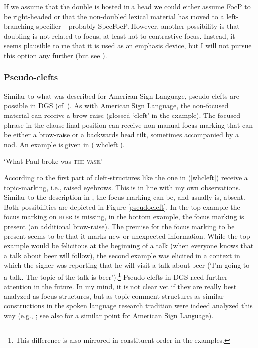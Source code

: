 \noindent If we assume that the double is hosted in a head we could either assume FocP to be right-headed or that the non-doubled lexical material has moved to a left-branching specifier -- probably SpecFocP. However, another possibility is that doubling is not related to focus, at least not to contrastive focus. Instead, it seems plausible to me that it is used as an emphasis device, but I will not pursue this option any further (but see \citealt{wilbur2012informationstructure}).



\subsubsection{Pseudo-clefts}
Similar to what was described for American Sign Language, pseudo-clefts are possible in DGS (cf. \citealt[397]{happ2014vork}). As with American Sign Language, the non-focused material can receive a brow-raise (glossed `cleft' in the example). The focused phrase in the clause-final position can receive non-manual focus marking that can be either a brow-raise or a backwards head tilt, sometimes accompanied by a nod. An example is given in (\ref{whcleft}).%

\begin{exe}
\ex {} 
\glt `What Paul broke was \textsc{the vase}.' \label{whcleft}
\end{exe}

\noindent According to \citet[397]{happ2014vork} the first part of cleft-structures like the one in (\ref{whcleft}) receive a topic-marking, i.e., raised eyebrows. This is in line with my own observations. Similar to the description in \citet[397]{happ2014vork}, the focus marking can be, and usually is, absent. Both possibilities are depicted in Figure \ref{pseudocleft}. In the top example the focus marking on \textsc{beer} is missing, in the bottom example, the focus marking is present (an additional brow-raise). The premise for the focus marking to be present seems to be that it marks new or unexpected information. While the top example would be felicitous at the beginning of a talk (when everyone knows that a talk about beer will follow), the second example was elicited in a context in which the signer was reporting that he will visit a talk about beer (`I'm going to a talk. The topic of the talk is beer').\footnote{ This difference is also mirrored in constituent order in the examples.} Pseudo-clefts in DGS need further attention in the future. In my mind, it is not clear yet if they are really best analyzed as focus structures, but as topic-comment structures as similar constructions in the spoken language research tradition were indeed analyzed this way (e.g., \citealt{prince1978,gast2014}; see also \citealt{caponigro2011ask} for a similar point for American Sign Language).

